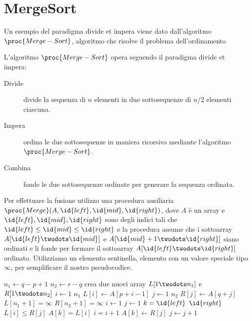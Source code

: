 \section{MergeSort}
Un esempio del paradigma divide et impera viene dato dall'algoritmo $\proc{Merge-Sort}$,
algoritmo che risolve il problema dell'ordinamento

L'algoritmo $\proc{Merge-Sort}$ opera seguendo il paradigma divide et impera:
\begin{description}
    \item[Divide]divide la sequenza di $n$ elementi in due sottosequenze di $n/2$ elementi ciascuna.
    \item[Impera]ordina le due sottosequenze in maniera ricorsiva mediante l'algoritmo $\proc{Merge-Sort}$.
    \item[Combina]fonde le due sottosequenze ordinate per generare la sequenza ordinata.
\end{description}
Per effettuare la fusione utilizzo una procedura ausiliaria $\proc{Merge}(A,\id{left},\id{mid},\id{right})$,
dove $A$ è un array e $\id{left},\id{mid},\id{right}$ sono degli indici tali che
$\id{left} \leq \id{mid} \leq \id{right}$ e la procedura assume che i sottoarray
$A[\id{left} \twodots \id{mid}]$ e $A[\id{mid}+1 \twodots \id{right}]$ siano ordinati
e li fonde per formare il sottoarray $A[\id{left} \twodots \id{right}]$ ordinato.
Utilizziamo un elemento sentinella, elemento con un valore speciale tipo $\infty$,
per semplificare il nostro pseudocodice.
\begin{codebox}
\li $n_1 \gets q - p + 1$
\li $n_2 \gets r - q$
\li crea due nuovi array $L[1 \twodots n_1]$ e $R[1 \twodots n_2]$
\li \For $i \gets 1$ \To $n_1$
         \Do
\li      $L[i] \gets A[p+i-1]$
        \End
\li \For $j \gets 1$ \To $n_2$
        \Do
\li      $R[j] \gets A[q+j]$
        \End
\li $L[n_1+1] = \infty$
\li $R[n_2+1] = \infty$
\li $i \gets 1$
\li $j \gets 1$
\li \For $k = \id{left}$ \To $\id{right}$
    \Do
\li      \If $L[i] \leq R[j]$
         \Then
\li              $A[k] = L[i]$
\li              $i = i+1$
         \End
\li      \Else $A[k] \gets R[j]$
\li            $j \gets j+1$
    \End
\end{codebox}


